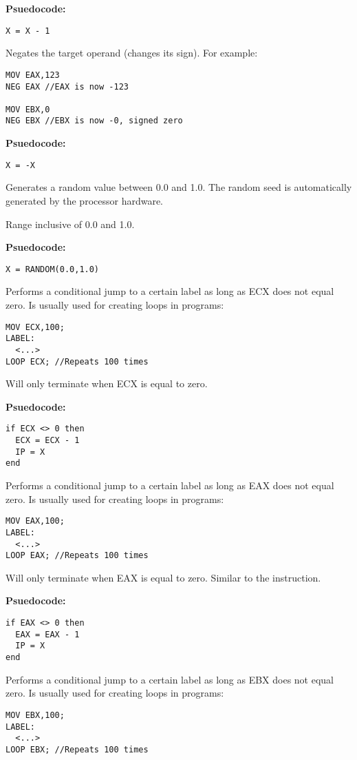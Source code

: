 \textbf{Psuedocode:}
\begin{verbatim}
X = X - 1
\end{verbatim}


Negates the target operand (changes its sign). For example:
\begin{verbatim}
MOV EAX,123
NEG EAX //EAX is now -123

MOV EBX,0
NEG EBX //EBX is now -0, signed zero
\end{verbatim}

\textbf{Psuedocode:}
\begin{verbatim}
X = -X
\end{verbatim}


Generates a random value between 0.0 and 1.0. The random seed is automatically generated by the processor hardware.

Range inclusive of 0.0 and 1.0.

\textbf{Psuedocode:}
\begin{verbatim}
X = RANDOM(0.0,1.0)
\end{verbatim}


Performs a conditional jump to a certain label as long as ECX does not equal zero. Is usually used for creating loops in programs:
\begin{verbatim}
MOV ECX,100;
LABEL:
  <...>
LOOP ECX; //Repeats 100 times
\end{verbatim}

Will only terminate when ECX is equal to zero.

\textbf{Psuedocode:}
\begin{verbatim}
if ECX <> 0 then
  ECX = ECX - 1
  IP = X
end
\end{verbatim}


Performs a conditional jump to a certain label as long as EAX does not equal zero. Is usually used for creating loops in programs:
\begin{verbatim}
MOV EAX,100;
LABEL:
  <...>
LOOP EAX; //Repeats 100 times
\end{verbatim}

Will only terminate when EAX is equal to zero. Similar to the  instruction.

\textbf{Psuedocode:}
\begin{verbatim}
if EAX <> 0 then
  EAX = EAX - 1
  IP = X
end
\end{verbatim}


Performs a conditional jump to a certain label as long as EBX does not equal zero. Is usually used for creating loops in programs:
\begin{verbatim}
MOV EBX,100;
LABEL:
  <...>
LOOP EBX; //Repeats 100 times
\end{verbatim}

